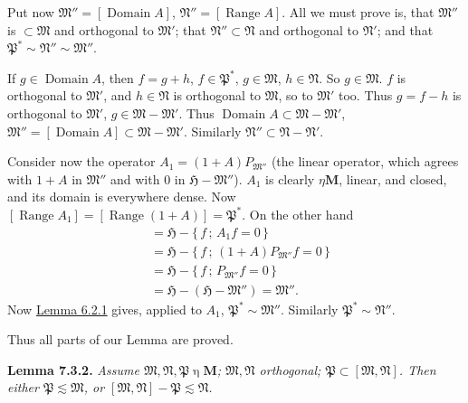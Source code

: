 \documentclass[12pt,b5paper,twoside]{article}
\newcommand{\Hspace}{\mathfrak H}
\newcommand{\M}{\mathbf M}
\newcommand{\setof}[2]{\{\,#1\,;\,#2\,\}}
\newcommand{\Lemma}[1]{%
  \par\smallskip\noindent\phantomsection\label{lem:#1}\textbf{Lemma #1.}\enspace
}
\newcommand{\lemref}[1]{\hyperref[lem:#1]{Lemma #1}}
\begin{document}
Put now \(\mathfrak M''=[\operatorname{Domain}A]\),
\(\mathfrak N''=[\operatorname{Range}A]\). All we must prove is, that
\(\mathfrak M''\) is \(\subset\mathfrak M\) and orthogonal to
\(\mathfrak M'\); that \(\mathfrak N''\subset\mathfrak N\) and orthogonal
to \(\mathfrak N'\); and that
\(\mathfrak P^*\sim\mathfrak N''\sim\mathfrak M''\).

If \(g\in\operatorname{Domain}A\), then \(f=g+h\),
\(f\in\mathfrak P^*\), \(g\in\mathfrak M\), \(h\in\mathfrak N\). So
\(g\in\mathfrak M\). \(f\) is orthogonal to \(\mathfrak M'\), and
\(h\in\mathfrak N\) is orthogonal to \(\mathfrak M\), so to
\(\mathfrak M'\) too. Thus \(g=f-h\) is orthogonal to \(\mathfrak M'\),
\(g\in\mathfrak M-\mathfrak M'\). Thus
\(\operatorname{Domain}A\subset\mathfrak M-\mathfrak M'\),
\(\mathfrak M''=[\operatorname{Domain}A]
\subset\mathfrak M-\mathfrak M'\). Similarly
\(\mathfrak N''\subset\mathfrak N-\mathfrak N'\).

Consider now the operator
\(A_1=(1+A)P_{\mathfrak M''}\) (the linear operator, which agrees with
\(1+A\) in \(\mathfrak M''\) and with 0 in
\(\Hspace-\mathfrak M''\)). \(A_1\) is clearly
\(\mathbin{\eta}\M\), linear, and closed, and its domain is everywhere
dense. Now
\([\operatorname{Range}A_1]
=[\operatorname{Range}(1+A)]=\mathfrak P^*\). On the other hand
\begin{align*}
 [\operatorname{Range}A_1^*]
 &=\Hspace-\setof{f}{A_1f=0}\\
 &=\Hspace-\setof{f}{(1+A)P_{\mathfrak M''}f=0}\\
 &=\Hspace-\setof{f}{P_{\mathfrak M''}f=0}\\
 &=\Hspace-(\Hspace-\mathfrak M'')=\mathfrak M''.
\end{align*}
Now \lemref{6.2.1} gives, applied to \(A_1\),
\(\mathfrak P^*\sim\mathfrak M''\). Similarly
\(\mathfrak P^*\sim\mathfrak N''\).

Thus all parts of our Lemma are proved.

\Lemma{7.3.2} \emph{Assume
\(\mathfrak M,\mathfrak N,\mathfrak P\mathbin{\eta}\M\);
\(\mathfrak M,\mathfrak N\) orthogonal;
\(\mathfrak P\subset[\mathfrak M,\mathfrak N]\). Then either
\(\mathfrak P\lesssim\mathfrak M\), or
\([\mathfrak M,\mathfrak N]-\mathfrak P\lesssim\mathfrak N\).}
\end{document}
